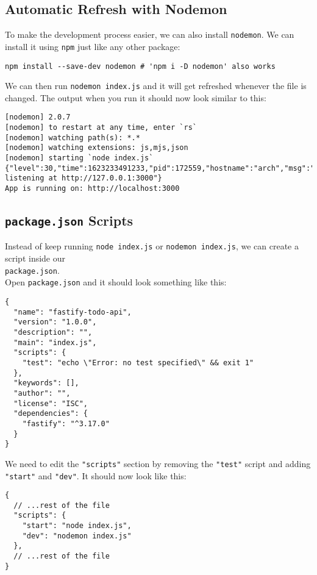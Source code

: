 \documentclass[a4paper,14pt,titlepage]{article}
\def\c#1{\texttt{#1}}
\begin{document}
\subsection{Automatic Refresh with Nodemon}

To make the development process easier, we can also install \c{nodemon}.
We can install it using \c{npm} just like any other package:

\begin{verbatim}
npm install --save-dev nodemon # 'npm i -D nodemon' also works
\end{verbatim}

We can then run \c{nodemon index.js} and it will get refreshed whenever
the file is changed. The output when you run it should now look similar to this:

\begin{verbatim}
[nodemon] 2.0.7
[nodemon] to restart at any time, enter `rs`
[nodemon] watching path(s): *.*
[nodemon] watching extensions: js,mjs,json
[nodemon] starting `node index.js`
{"level":30,"time":1623233491233,"pid":172559,"hostname":"arch","msg":"Server listening at http://127.0.0.1:3000"}
App is running on: http://localhost:3000
\end{verbatim}

\newpage

\subsection{\c{package.json} Scripts}

Instead of keep running \c{node index.js} or \texttt{nodemon index.js}, we
can create a script inside our \\ \c{package.json}.\\

Open \c{package.json} and it should look something like this:

\begin{verbatim}
{
  "name": "fastify-todo-api",
  "version": "1.0.0",
  "description": "",
  "main": "index.js",
  "scripts": {
    "test": "echo \"Error: no test specified\" && exit 1"
  },
  "keywords": [],
  "author": "",
  "license": "ISC",
  "dependencies": {
    "fastify": "^3.17.0"
  }
}
\end{verbatim}

We need to edit the \c{"scripts"} section by removing the \texttt{"test"}
script and adding \c{"start"} and \texttt{"dev"}. It should now look like
this:

\begin{verbatim}
{
  // ...rest of the file
  "scripts": {
    "start": "node index.js",
    "dev": "nodemon index.js"
  },
  // ...rest of the file
}
\end{verbatim}
\end{document}
